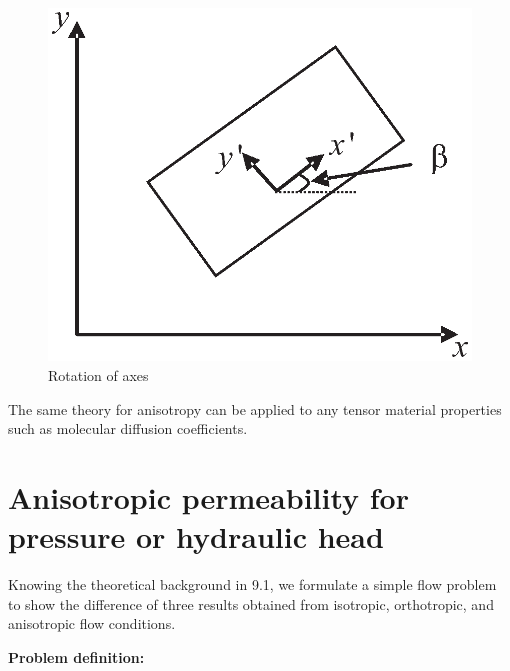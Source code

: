 \begin{figure}[H]
\centering
\includegraphics[scale=0.60]{Anisotropy/figures/rotation.eps}
\caption{Rotation of axes}
\label{RotationOfAxes}
\end{figure}

The same theory for anisotropy can be applied to any tensor material properties such as molecular diffusion coefficients.

\section{Anisotropic permeability for pressure or hydraulic head}

Knowing the theoretical background in 9.1, we formulate a simple flow problem to show the difference of three results obtained from isotropic, orthotropic, and anisotropic flow conditions.

\textbf{Problem definition:}

